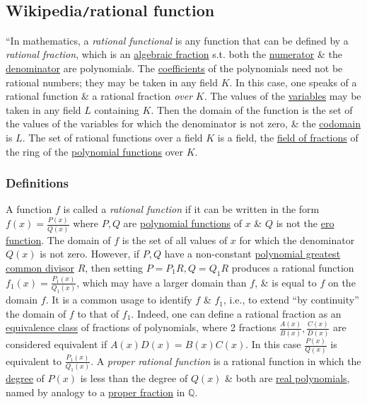 \documentclass{article}
\begin{document}

\subsection{Wikipedia{\tt/}rational function}
``In mathematics, a {\it rational functional} is any function that can be defined by a {\it rational fraction}, which is an \href{https://en.wikipedia.org/wiki/Algebraic_fraction}{algebraic fraction} s.t. both the \href{https://en.wikipedia.org/wiki/Numerator}{numerator} \& the \href{https://en.wikipedia.org/wiki/Denominator}{denominator} are polynomials. The \href{https://en.wikipedia.org/wiki/Coefficient}{coefficients} of the polynomials need not be rational numbers; they may be taken in any field $K$. In this case, one speaks of a rational function \& a rational fraction {\it over} $K$. The values of the \href{https://en.wikipedia.org/wiki/Variable_(mathematics)}{variables} may be taken in any field $L$ containing $K$. Then the domain of the function is the set of the values of the variables for which the denominator is not zero, \& the \href{https://en.wikipedia.org/wiki/Codomain}{codomain} is $L$. The set of rational functions over a field $K$ is a field, the \href{https://en.wikipedia.org/wiki/Field_of_fractions}{field of fractions} of the ring of the \href{https://en.wikipedia.org/wiki/Polynomial_function}{polynomial functions} over $K$.

\subsubsection{Definitions}
A function $f$ is called a {\it rational function} if it can be written in the form $f(x) = \frac{P(x)}{Q(x)}$ where $P,Q$ are \href{https://en.wikipedia.org/wiki/Polynomial_function}{polynomial functions} of $x$ \& $Q$ is not the \href{https://en.wikipedia.org/wiki/Zero_function}{ero function}. The domain of $f$ is the set of all values of $x$ for which the denominator $Q(x)$ is not zero. However, if $P,Q$ have a non-constant \href{https://en.wikipedia.org/wiki/Polynomial_greatest_common_divisor}{polynomial greatest common divisor} $R$, then setting $P = P_1R,Q = Q_1R$ produces a rational function $f_1(x) = \frac{P_1(x)}{Q_1(x)}$, which may have a larger domain than $f$, \& is equal to $f$ on the domain $f$. It is a common usage to identify $f$ \& $f_1$, i.e., to extend ``by continuity'' the domain of $f$ to that of $f_1$. Indeed, one can define a rational fraction as an \href{https://en.wikipedia.org/wiki/Equivalence_class}{equivalence class} of fractions of polynomials, where 2 fractions $\frac{A(x)}{B(x)},\frac{C(x)}{D(x)}$ are considered equivalent if $A(x)D(x) = B(x)C(x)$. In this case $\frac{P(x)}{Q(x)}$ is equivalent to $\frac{P_1(x)}{Q_1(x)}$. A {\it proper rational function} is a rational function in which the \href{https://en.wikipedia.org/wiki/Degree_of_a_polynomial}{degree} of $P(x)$ is less than the degree of $Q(x)$ \& both are \href{https://en.wikipedia.org/wiki/Real_polynomial}{real polynomials}, named by analogy to a \href{https://en.wikipedia.org/wiki/Fraction#Proper_and_improper_fractions}{proper fraction} in $\mathbb{Q}$.
\end{document}
